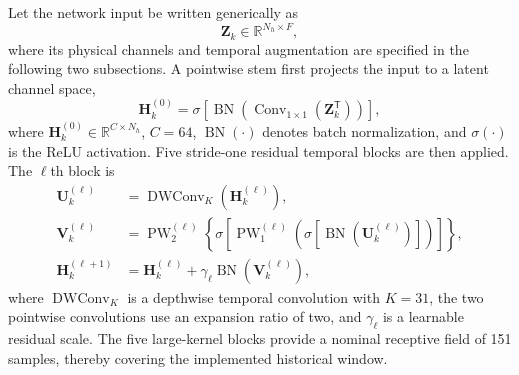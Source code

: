 \documentclass{ieeeaccess}
\begin{document}
Let the network input be written generically as
\begin{equation}
\mathbf Z_k\in\mathbb R^{N_h\times F},
\label{eq:generic_moderntcn_input}
\end{equation}
where its physical channels and temporal augmentation are specified in the following two subsections. A pointwise stem first projects the input to a latent channel space,
\begin{equation}
\mathbf H_k^{(0)}=\sigma\!\left[
\operatorname{BN}\!\left(
\operatorname{Conv}_{1\times1}(\mathbf Z_k^{\mathsf T})
\right)\right],
\label{eq:moderntcn_stem}
\end{equation}
where $\mathbf H_k^{(0)}\in\mathbb R^{C\times N_h}$, $C=64$, $\operatorname{BN}(\cdot)$ denotes batch normalization, and $\sigma(\cdot)$ is the ReLU activation. Five stride-one residual temporal blocks are then applied. The $\ell$th block is
\begin{align}
\mathbf U_k^{(\ell)}
 &=\operatorname{DWConv}_{K}\!\left(\mathbf H_k^{(\ell)}\right),\nonumber\\
\mathbf V_k^{(\ell)}
 &=\operatorname{PW}_{2}^{(\ell)}\!\left\{
\sigma\!\left[\operatorname{PW}_{1}^{(\ell)}
\!\left(\sigma\!\left[\operatorname{BN}
(\mathbf U_k^{(\ell)})\right]\right)\right]\right\},\nonumber\\
\mathbf H_k^{(\ell+1)}
 &=\mathbf H_k^{(\ell)}
 +\gamma_{\ell}\operatorname{BN}\!\left(\mathbf V_k^{(\ell)}\right),
\label{eq:moderntcn_small_block}
\end{align}
where $\operatorname{DWConv}_{K}$ is a depthwise temporal convolution with $K=31$, the two pointwise convolutions use an expansion ratio of two, and $\gamma_{\ell}$ is a learnable residual scale. The five large-kernel blocks provide a nominal receptive field of 151 samples, thereby covering the implemented historical window.
\end{document}
